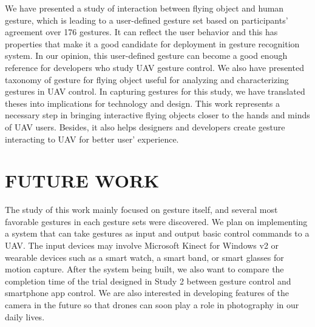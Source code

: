 \documentclass{sigchi}
\begin{document}
We have presented a study of interaction between flying object and  human gesture, which is leading to a user-defined gesture set based on participants' agreement over 176 gestures. It can reflect the user behavior and this has properties that make it a good candidate for deployment in gesture recognition system. In our opinion, this user-defined gesture can become a good enough reference for developers who study UAV gesture control. We also have presented taxonomy of gesture for flying object useful for analyzing and characterizing gestures in UAV control. In capturing gestures for this study, we have translated theses into implications for technology and design. This work represents a necessary step in bringing interactive flying objects closer to the hands and minds of UAV users. Besides, it also helps designers and developers create gesture interacting to UAV for better user' experience. 


\section{FUTURE WORK}

The study of this work mainly focused on gesture itself, and several most favorable gestures in each gesture sets were discovered. We plan on implementing a system that can take gestures as input and output basic control commands to a UAV. The input devices may involve Microsoft Kinect for Windows v2 or wearable devices such as a smart watch, a smart band, or smart glasses for motion capture. After the system being built, we also want to compare the completion time of the trial designed in Study 2 between gesture control and smartphone app control. We are also interested in developing features of the camera in the future so that drones can soon play a role in photography in our daily lives.


%
%
%
%
%
\balance




\end{document}
